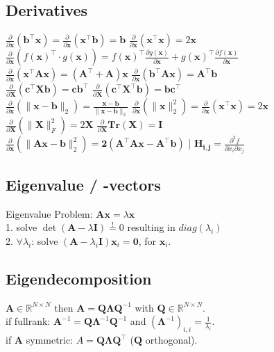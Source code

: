 \subsection*{Derivatives}
$\frac{\partial}{\partial \mathbf{x}}(\mathbf{b}^\top \mathbf{x}) = \frac{\partial}{\partial \mathbf{x}}(\mathbf{x}^\top \mathbf{b}) = \mathbf{b}$ \quad
$\frac{\partial}{\partial \mathbf{x}}(\mathbf{x}^\top \mathbf{x}) = 2\mathbf{x}$\\
$\frac{\partial}{\partial \mathbf{x}}(f(\mathbf{x})^\top\cdot g(\mathbf{x})) = f(\mathbf{x})^\top \frac{\partial g(\mathbf{x})}{\partial \mathbf{x}} + g(\mathbf{x})^\top \frac{\partial f(\mathbf{x})}{\partial \mathbf{x}}$\\
$\frac{\partial}{\partial \mathbf{x}}(\mathbf{x}^\top \mathbf{A}\mathbf{x}) = (\mathbf{A}^\top + \mathbf{A})\mathbf{x}$ \quad
$\frac{\partial}{\partial \mathbf{x}}(\mathbf{b}^\top \mathbf{A}\mathbf{x}) = \mathbf{A}^\top \mathbf{b}$\\
$\frac{\partial}{\partial \mathbf{X}}(\mathbf{c}^\top \mathbf{X} \mathbf{b}) = \mathbf{c}\mathbf{b}^\top$ \quad
$\frac{\partial}{\partial \mathbf{X}}(\mathbf{c}^\top \mathbf{X}^\top \mathbf{b}) = \mathbf{b}\mathbf{c}^\top$\\
$\frac{\partial}{\partial \mathbf{x}}(\| \mathbf{x}-\mathbf{b} \|_2) = \frac{\mathbf{x}-\mathbf{b}}{\|\mathbf{x}-\mathbf{b}\|_2}$ \quad
$\frac{\partial}{\partial \mathbf{x}}(\|\mathbf{x}\|^2_2) = \frac{\partial}{\partial \mathbf{x}} (\mathbf{x}^\top \mathbf{x}) = 2\mathbf{x}$\\
$\frac{\partial}{\partial \mathbf{X}}(\|\mathbf{X}\|_F^2) = 2\mathbf{X}$\quad
$\frac{\partial}{\partial \mathbf{X}} \mathbf{Tr}(\mathbf{X})=\mathbf{I}$ \\
$\frac{\partial}{\partial \mathbf{x}}(\|\mathbf{Ax - b}\|_2^2) = \mathbf{2(A^\top Ax-A^\top b)}$ |
$\mathbf{H_{i,j}}=\frac{\partial^2 f}{\partial x_i \partial x_j}$

\subsection*{Eigenvalue / -vectors}
Eigenvalue Problem: $\mathbf{Ax} = \lambda \mathbf{x}$\\
1. solve $\operatorname{det}(\mathbf{A} - \lambda \mathbf{I}) \overset{!}{=} 0$ resulting in $diag(\lambda_i)$\\
2. $\forall \lambda_i$:
solve $(\mathbf{A} - \lambda_i \mathbf{I}) \mathbf{x}_i = \mathbf{0}$, for $\mathbf{x}_i$.

\subsection*{Eigendecomposition}
$\mathbf{A} \in \mathbb{R}^{N \times N}$ then $\mathbf{A} = \mathbf{Q} \boldsymbol{\Lambda} \mathbf{Q}^{-1}$ with $\mathbf{Q} \in \mathbb{R}^{N \times N}$.\\
if fullrank: $\mathbf{A}^{-1} = \mathbf{Q} \boldsymbol{\Lambda}^{-1} \mathbf{Q}^{-1}$ and $(\boldsymbol{\Lambda}^{-1})_{i,i} = \frac{1}{\lambda_i}$.\\
if $\mathbf{A}$ symmetric: $A = \mathbf{Q} \boldsymbol{\Lambda} \mathbf{Q^\top}$ ($\mathbf{Q}$ orthogonal).

